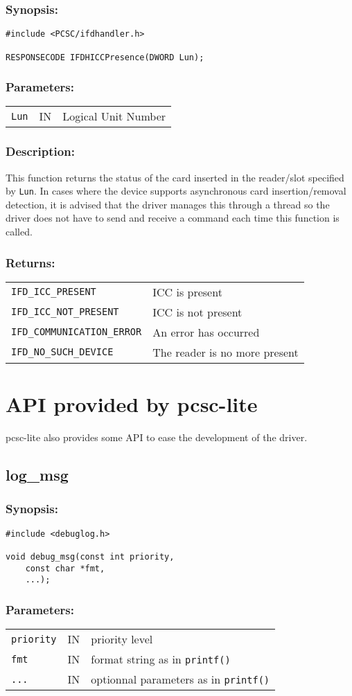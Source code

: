 \documentclass[a4paper,12pt]{article}
\newcommand{\synopsis}{\subsubsection{Synopsis:}}
\newcommand{\parameters}{\subsubsection{Parameters:}}
\newcommand{\desc}{\subsubsection{Description:}}
\newcommand{\returns}{\subsubsection{Returns:}}
\begin{document}
\synopsis
\begin{verbatim}
#include <PCSC/ifdhandler.h>

RESPONSECODE IFDHICCPresence(DWORD Lun);
\end{verbatim}

\parameters

\begin{tabular}{lll}
\texttt{Lun} & IN & Logical Unit Number
\end{tabular}

\desc

This function returns the status of the card inserted in the reader/slot
specified by \texttt{Lun}. In cases where the device supports
asynchronous card insertion/removal detection, it is advised that the
driver manages this through a thread so the driver does not have to send
and receive a command each time this function is called.

\returns

\begin{tabular}{ll}
\texttt{IFD\_ICC\_PRESENT} & ICC is present\\
\texttt{IFD\_ICC\_NOT\_PRESENT} & ICC is not present\\
\texttt{IFD\_COMMUNICATION\_ERROR} & An error has occurred\\
\texttt{IFD\_NO\_SUCH\_DEVICE} & The reader is no more present\\
\end{tabular}


\section{API provided by pcsc-lite}

pcsc-lite also provides some API to ease the development of the driver.


\subsection{log\_msg}

\synopsis
\begin{verbatim}
#include <debuglog.h>

void debug_msg(const int priority,
    const char *fmt,
    ...);
\end{verbatim}

\parameters

\begin{tabular}{lll}
\texttt{priority} & IN & priority level \\
\texttt{fmt} & IN & format string as in \texttt{printf()} \\
\texttt{...} & IN & optionnal parameters as in \texttt{printf()} \\
\end{tabular}
\end{document}
